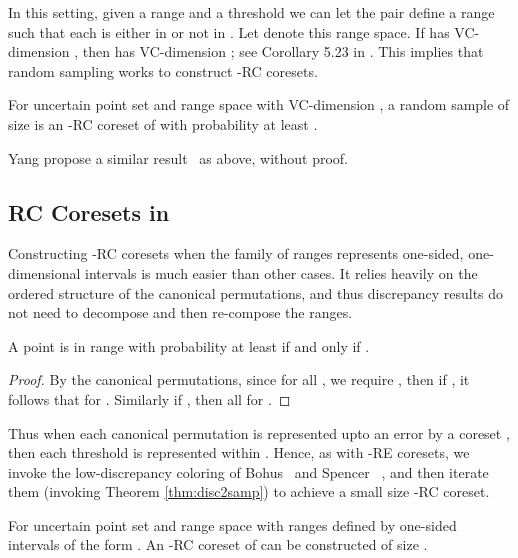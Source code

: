 \documentclass[11pt]{myclass}
\newcommand{\RC}{\textsf{RC}\xspace}
\newcommand{\RE}{\textsf{RE}\xspace}
\begin{document}
In this setting, given a range  and a threshold  we can let the pair  define a range  such that each  is either in or not in .  Let  denote this range space.   If  has VC-dimension , then  has VC-dimension ;  see Corollary 5.23 in \cite{peled}.  This implies that random sampling works to construct -RC coresets.  

\begin{theorem}
\label{thm:RC-sample}
For uncertain point set  and range space  with VC-dimension , a random sample  of size  is an -RC coreset of  with probability at least .  
\end{theorem}

Yang \etal propose a similar result~\cite{aggregate} as above, without proof.

\subsection{\RC Coresets in }
Constructing -\RC coresets when the family of ranges  represents one-sided, one-dimensional intervals is much easier than other cases.  It relies heavily on the ordered structure of the canonical permutations, and thus discrepancy results do not need to decompose and then re-compose the ranges.  


\begin{lemma} \label{lem:rc-query}
A point  is in range  with probability at least  if and only if .
\end{lemma}

\begin{proof}
By the canonical permutations, since for all , we require , then if , it follows that  for .  
Similarly if , then all  for .  
\end{proof}

Thus when each canonical permutation is represented upto an error  by a coreset , then each threshold  is represented within .  Hence, as with -\RE coresets, we invoke the low-discrepancy coloring of Bohus~\cite{bohus} and Spencer \etal~\cite{spencer}, and then iterate them (invoking Theorem \ref{thm:disc2samp}) to achieve a small size -\RC coreset.  





\begin{theorem}\label{thm:1deps-RC}
For uncertain point set  and range space  with ranges defined by one-sided intervals of the form .  
An -\RC coreset of  can be constructed of size .
\end{theorem}
\end{document}
